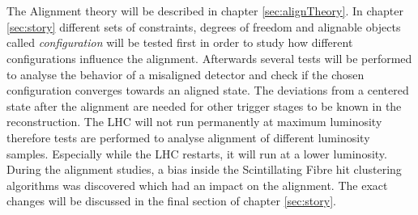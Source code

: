 \\
\\
The Alignment theory will be described in chapter \ref{sec:alignTheory}. In chapter \ref{sec:story} different sets of constraints, degrees of freedom
and alignable objects called \textit{configuration} will be tested first in order
to study how different configurations influence the alignment. Afterwards several
tests will be performed to analyse the behavior of a misaligned detector and check
if the chosen configuration converges towards an aligned state.
The deviations from a centered state after the alignment are needed for other trigger stages to be known in the reconstruction.
The LHC will not run permanently at maximum luminosity therefore tests are performed to analyse alignment of different luminosity samples. Especially while the LHC restarts, it will run at a lower luminosity.
During the alignment studies, a bias inside the Scintillating Fibre hit clustering algorithms was discovered which had an impact on the alignment. The exact changes will be discussed in the final section of chapter \ref{sec:story}.

